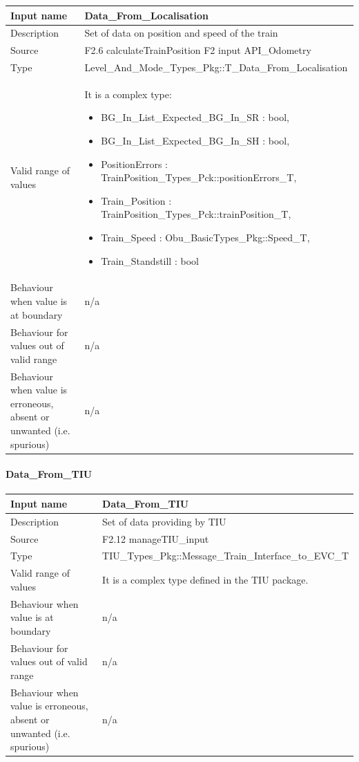 \begin{longtable}{p{}p{}}
\toprule
Input name				& Data\_From\_Localisation \\
\midrule
Description				& Set of data on position and speed of the train \\
\midrule
Source					& F2.6 calculateTrainPosition\newline
F2 input API\_Odometry \\ 
\midrule
Type					& Level\_And\_Mode\_Types\_Pkg::T\_Data\_From\_Localisation \\
\midrule
Valid range of values	& It is a complex type: 
\begin{itemize}
\item BG\_In\_List\_Expected\_BG\_In\_SR : bool,
\item  BG\_In\_List\_Expected\_BG\_In\_SH : bool, 
\item PositionErrors : TrainPosition\_Types\_Pck::positionErrors\_T,
\item  Train\_Position : TrainPosition\_Types\_Pck::trainPosition\_T,
\item Train\_Speed : Obu\_BasicTypes\_Pkg::Speed\_T, 
\item Train\_Standstill : bool
\end{itemize} \\
\midrule
Behaviour when value is at boundary	& n/a \\ 
\midrule
Behaviour for values out of valid range	& n/a \\ 
\midrule
Behaviour when value is erroneous, absent or unwanted (i.e. spurious) & n/a \\ 
\bottomrule
\end{longtable}

\paragraph{Data\_From\_TIU}

\begin{longtable}{p{}p{}}
\toprule
Input name				& Data\_From\_TIU \\
\midrule
Description				& Set of data providing by TIU \\
\midrule
Source					& F2.12 manageTIU\_input \\ 
\midrule
Type					& TIU\_Types\_Pkg::Message\_Train\_Interface\_to\_EVC\_T \\
\midrule
Valid range of values	& It is a complex type defined in the TIU package. \\
\midrule
Behaviour when value is at boundary	& n/a \\ 
\midrule
Behaviour for values out of valid range	& n/a \\ 
\midrule
Behaviour when value is erroneous, absent or unwanted (i.e. spurious) & n/a \\ 
\bottomrule
\end{longtable}


